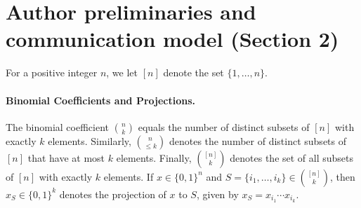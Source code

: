 \documentclass[10pt,a4paper]{article}
\begin{document}
\section*{Author preliminaries and communication model (Section 2)}
For a positive integer $n$, we let $[n]$ denote the set $\{1,\ldots,n\}$.
\paragraph{Binomial Coefficients and Projections.} The binomial coefficient $\binom nk$ equals the number of distinct subsets of $[n]$ with exactly $k$ elements. Similarly, $\binom n{\le k}$ denotes the number of distinct subsets of $[n]$ that have at most $k$ elements. Finally, $\binom{[n]}k$ denotes the set of all subsets of $[n]$ with exactly $k$ elements.
If $x\in\{0,1\}^n$ and $S=\{i_1,\ldots,i_k\}\in\binom{[n]}k$, then $x_S\in\{0,1\}^k$ denotes the projection of $x$ to $S$, given by $x_S=x_{i_1}\cdots x_{i_k}$.
\end{document}
